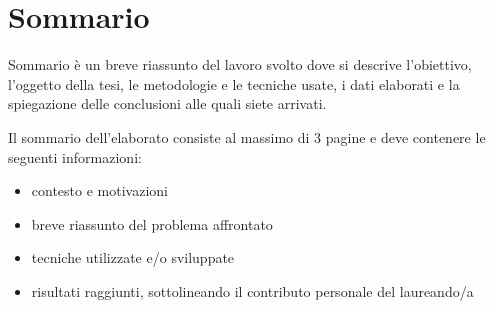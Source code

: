 \chapter*{Sommario} %
\label{sommario}





Sommario è un breve riassunto del lavoro svolto dove si descrive l'obiettivo, l'oggetto della tesi, le metodologie e le tecniche usate, i dati elaborati e la spiegazione delle conclusioni alle quali siete arrivati.  

Il sommario dell’elaborato consiste al massimo di 3 pagine e deve contenere le seguenti informazioni:
\begin{itemize}
  \item contesto e motivazioni 
  \item breve riassunto del problema affrontato
  \item tecniche utilizzate e/o sviluppate
  \item risultati raggiunti, sottolineando il contributo personale del laureando/a
\end{itemize}
